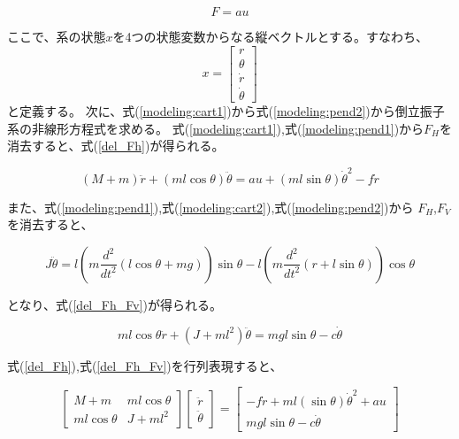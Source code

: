 \documentclass[a4j,11pt,twoside]{jbook}
\begin{document}
\begin{equation}
    F = au
    \label{F}
\end{equation}

ここで、系の状態$x$を4つの状態変数からなる縦ベクトルとする。すなわち、
$$
    x = \left[
    \begin{array}{c}
        r \\
        \theta \\
        \dot r \\
        \dot \theta
    \end{array}
    \right]
$$
と定義する。
次に、式(\ref{modeling:cart1})から式(\ref{modeling:pend2})から倒立振子系の非線形方程式を求める。
式(\ref{modeling:cart1}),式(\ref{modeling:pend1})から$F_{H}$を消去すると、式(\ref{del_Fh})が得られる。

\begin{equation}
    (M + m) \ddot r + (ml\cos \theta) \ddot \theta = au + (ml\sin \theta) \dot \theta^2 - f \dot r
    \label{del_Fh}
\end{equation}

また、式(\ref{modeling:pend1}),式(\ref{modeling:cart2}),式(\ref{modeling:pend2})から
$F_{H}$,$F_{V}$を消去すると、

$$
    J \ddot \theta = l\left(
        m\frac{d^2}{dt^2}\left(
            l\cos \theta + mg
            \right)
        \right)\sin \theta
        -
        l\left(
            m\frac{d^2}{dt^2}\left(
                r + l\sin \theta
            \right)
        \right)\cos \theta
$$

となり、式(\ref{del_Fh_Fv})が得られる。

\begin{equation}
    ml\cos \theta \ddot r + (J + ml^2) \ddot \theta = mgl\sin \theta -c \dot \theta
    \label{del_Fh_Fv}
\end{equation}

式(\ref{del_Fh}),式(\ref{del_Fh_Fv})を行列表現すると、

$$
    \left[
    \begin{array}{cc}
        M + m          &  ml\cos \theta \\
        ml\cos \theta  &  J + ml^2
    \end{array}
    \right]
    \left[
    \begin{array}{c}
        \ddot r \\
        \ddot \theta
    \end{array}    
    \right]
    =
    \left[
        \begin{array}{c}
            -f \dot r + ml(\sin \theta) \dot \theta^2 + au \\
            mgl\sin \theta - c \dot \theta
        \end{array}
    \right]
$$
\end{document}
